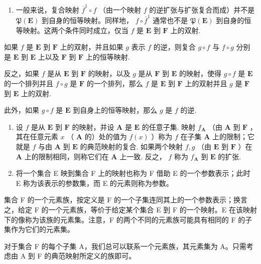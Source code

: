 \begin{enumerate}
\def\labelenumi{\arabic{enumi}.}
\setcounter{enumi}{11}
\tightlist
\item
  一般来说，复合映射 \(\overline{f}^{1} \circ f\) （由一个映射 \(f\) 的逆扩张与扩张复合而成）并不是 \(\mathfrak{P}(\mathbf{E})\) 到自身的恒等映射。同样地， \(f \circ \overline{f}^1\) 通常也不是 \(\mathfrak{P}(\mathbf{E})\) 到自身的恒等映射。这两个条件同时成立，仅当 \(f\) 是 \(\mathbf{E}\) 到 \(\mathbf{F}\) 上的双射.
\end{enumerate}

如果 \(f\) 是 \(\mathbf{E}\) 到 \(\mathbf{F}\) 上的双射，并且如果 \(g\) 表示 \(f\) 的逆，则复合 \(g \circ f\) 与 \(f \circ g\) 分别是 \(\mathbf{E}\) 到 \(\mathbf{E}\) 上以及 \(\mathbf{F}\) 到 \(\mathbf{F}\) 上的恒等映射.

反之，如果 \(f\) 是从 \(\mathbf{E}\) 到 \(\mathbf{F}\) 的映射，以及 \(g\) 是从 \(\mathbf{F}\) 到 \(\mathbf{E}\) 的映射，使得 \(g \circ f\) 是 \(\mathbf{E}\) 的一个排列并且 \(f \circ g\) 是 \(\mathbf{F}\) 的一个排列，那么 \(f\) 是 \(\mathbf{E}\) 到 \(\mathbf{F}\) 上的双射并且 \(g\) 是 \(\mathbf{F}\) 到 \(\mathbf{E}\) 上的双射.

此外，如果 \(g \circ f\) 是 \(\mathbf{E}\) 到自身上的恒等映射，那么 \(g\) 是 \(f\) 的逆.

\begin{enumerate}
\def\labelenumi{\arabic{enumi}.}
\setcounter{enumi}{12}
\item
  设 \(f\) 是从 \(\mathbf{E}\) 到 \(\mathbf{F}\) 的映射，并设 \(\mathbf{A}\) 是 \(\mathbf{E}\) 的任意子集. 映射 \(f_{\mathbf{A}}\) （由 \(\mathbf{A}\) 到 \(\mathbf{F}\) ，其在任意元素 \(x\) （ \(\mathbf{A}\) 的）处的值为 \(f(x)\) ）称为 \(f\) 在子集 \(\mathbf{A}\) 上的限制；它就是 \(f\) 与由 \(\mathbf{A}\) 到 \(\mathbf{E}\) 的典范映射的复合. 如果两个映射 \(f, g\) （由 \(\mathbf{E}\) 到 \(\mathbf{F}\) ）在 \(\mathbf{A}\) 上的限制相同，则称它们在 \(\mathbf{A}\) 上一致. 反之， \(f\) 称为 \(f_{\mathbf{A}}\) 到 \(\mathbf{E}\) 的扩张.
\item
  将一个集合 E 映到集合 F 上的映射也称为 F 借助 E 的一个参数表示；此时 E 称为该表示的参数集，而 E 的元素则称为参数。
\end{enumerate}

集合 F 的一个元素族，按定义是 F 的一个子集连同其上的一个参数表示；换言之，给定 F 的一个元素族，等价于给定某个集合 E 到 F 的一个映射。E 在该映射下的像称为该族的元素集。注意，F 的两个不同的元素族可能具有相同的 F 的子集作为它们的元素集。

对于集合 F 的每个子集 A，我们总可以联系一个元素族，其元素集为 A。只需考虑由 A 到 F 的典范映射所定义的族即可。

